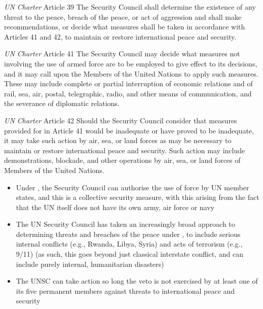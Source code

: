 \begin{conventiondetails}{\textit{UN Charter} Article 39}
    \flushleft
    The Security Council shall determine the existence of any threat to the peace, breach of the peace, or act of aggression and shall make recommendations, or decide what measures shall be taken in accordance with Articles 41 and 42, to maintain or restore international peace and security.
\end{conventiondetails}
    
\begin{conventiondetails}{\textit{UN Charter} Article 41}
    \flushleft
    The Security Council may decide what measures not involving the use of armed force are to be employed to give effect to its decisions, and it may call upon the Members of the United Nations to apply such measures. These may include complete or partial interruption of economic relations and of rail, sea, air, postal, telegraphic, radio, and other means of communication, and the severance of diplomatic relations.
\end{conventiondetails}

\begin{conventiondetails}{\textit{UN Charter} Article 42}
    \flushleft
    Should the Security Council consider that measures provided for in Article 41 would be inadequate or have proved to be inadequate, it may take such action by air, sea, or land forces as may be necessary to maintain or restore international peace and security. Such action may include demonstrations, blockade, and other operations by air, sea, or land forces of Members of the United Nations.
\end{conventiondetails}

\begin{itemize}
    \item Under , the Security Council can authorise the use of force by UN member states, and this is a collective security measure, with this arising from the fact that the UN itself does not have its own army, air force or navy
    \item The UN Security Council has taken an increasingly broad approach to determining threats and breaches of the peace under , to include serious internal conflicts (e.g., Rwanda, Libya, Syria) and acts of terrorism (e.g., 9/11) (as such, this goes beyond just classical interstate conflict, and can include purely internal, humanitarian disasters)
    \item The UNSC can take action so long the veto is not exercised by at least one of its five permanent members against threats to international peace and security
\end{itemize}

